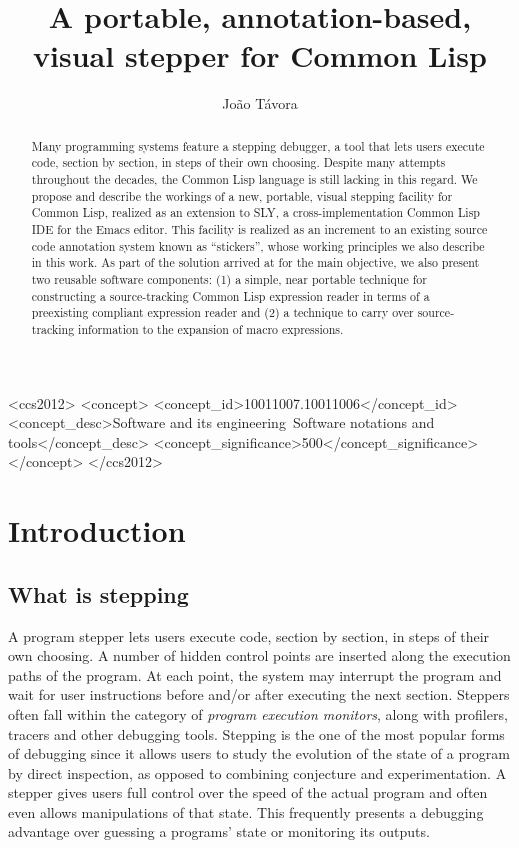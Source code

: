 \documentclass[sigconf]{acmart}
\author{João Távora} \affiliation{Ravenpack}
\begin{document}
\title{A portable, annotation-based, visual stepper for Common Lisp}

\begin{abstract}
  Many programming systems feature a stepping debugger, a tool that
  lets users execute code, section by section, in steps of their own
  choosing.  Despite many attempts throughout the decades, the Common
  Lisp language is still lacking in this regard.  We propose and
  describe the workings of a new, portable, visual stepping facility
  for Common Lisp, realized as an extension to SLY, a
  cross-implementation Common Lisp IDE for the Emacs editor.  This
  facility is realized as an increment to an existing source code
  annotation system known as ``stickers'', whose working principles we
  also describe in this work.  As part of the solution arrived at for
  the main objective, we also present two reusable software
  components: (1) a simple, near portable technique for constructing a
  source-tracking Common Lisp expression reader in terms of a
  preexisting compliant expression reader and (2) a technique to carry
  over source-tracking information to the expansion of macro
  expressions.
\end{abstract}


\begin{CCSXML}
<ccs2012>
   <concept>
       <concept_id>10011007.10011006</concept_id>
       <concept_desc>Software and its engineering~Software notations and tools</concept_desc>
       <concept_significance>500</concept_significance>
       </concept>
 </ccs2012>
\end{CCSXML}


\maketitle
\section{Introduction}
\subsection{What is stepping}

A program stepper lets users execute code, section by section, in
steps of their own choosing.  A number of hidden control points are
inserted along the execution paths of the program.  At each point, the
system may interrupt the program and wait for user instructions before
and/or after executing the next section.  Steppers often fall within
the category of \emph{program execution monitors}, along with
profilers, tracers and other debugging tools.  Stepping is the one of
the most popular forms of debugging since it allows users to study the
evolution of the state of a program by direct inspection, as opposed
to combining conjecture and experimentation.  A stepper gives users
full control over the speed of the actual program and often even
allows manipulations of that state.  This frequently presents a
debugging advantage over guessing a programs' state or monitoring its
outputs.
\end{document}
